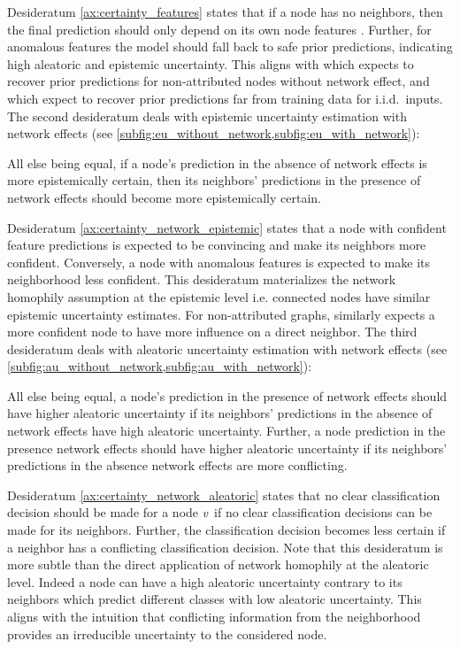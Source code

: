 Desideratum \ref{ax:certainty_features} states that if a node \smash{$\nodev$} has no neighbors, then the final prediction \smash{$\p\nodeidxv$} should only depend on its own node features \smash{$\x\nodeidxv$}. Further, for anomalous features the model should fall back to safe prior predictions, indicating high aleatoric and epistemic uncertainty. This aligns with \cite{Eswaran2017} which expects to recover prior predictions for non-attributed nodes without network effect, and \cite{provable-uncertainty, NatPN2021} which expect to recover prior predictions far from training data for i.i.d.\ inputs. The second desideratum deals with epistemic uncertainty estimation with network effects (see \cref{subfig:eu_without_network,subfig:eu_with_network}):
\begin{desiderata}
    \label{ax:certainty_network_epistemic}
    All else being equal, if a node's prediction in the absence of network effects is more epistemically certain, then its neighbors' predictions in the presence of network effects should become more epistemically certain.
\end{desiderata}
Desideratum \ref{ax:certainty_network_epistemic} states that a node \smash{$\nodev$} with confident feature predictions \smash{$\x\nodeidxv$} is expected to be convincing and make its neighbors \smash{$\nodeu \in \neighbors(\nodev)$} more confident. Conversely, a node with anomalous features is expected to make its neighborhood less confident. This desideratum materializes the network homophily assumption at the epistemic level i.e. connected nodes have similar epistemic uncertainty estimates. For non-attributed graphs, \cite{Eswaran2017} similarly expects a more confident node to have more influence on a direct neighbor. The third desideratum deals with aleatoric uncertainty estimation with network effects (see \cref{subfig:au_without_network,subfig:au_with_network}):
\begin{desiderata}
    \label{ax:certainty_network_aleatoric}
    All else being equal, a node's prediction in the presence of network effects should have higher aleatoric uncertainty if its neighbors' predictions in the absence of network effects have high aleatoric uncertainty. Further, a node prediction in the presence network effects should have higher aleatoric uncertainty if its neighbors' predictions in the absence network effects are more conflicting.
\end{desiderata}
Desideratum \ref{ax:certainty_network_aleatoric} states that no clear classification decision should be made for a node $\nodev$ if no clear classification decisions can be made for its neighbors. Further, the classification decision becomes less certain if a neighbor has a conflicting classification decision. Note that this desideratum is more subtle than the direct application of network homophily at the aleatoric level. Indeed a node can have a high aleatoric uncertainty contrary to its neighbors which predict different classes with low aleatoric uncertainty. This aligns with the intuition that conflicting information from the neighborhood provides an irreducible uncertainty to the considered node.